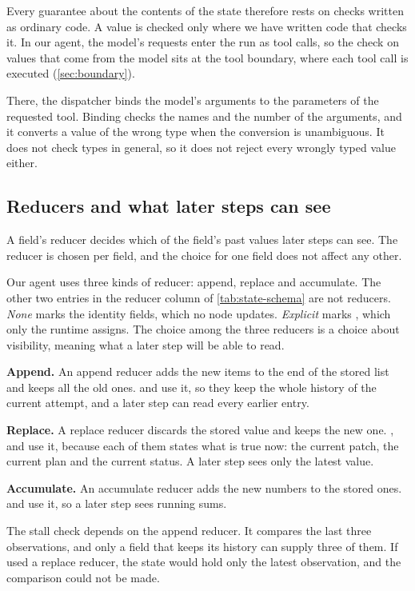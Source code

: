 Every guarantee about the contents of the state therefore rests on checks written as ordinary code.
A value is checked only where we have written code that checks it. In our agent, the model's
requests enter the run as tool calls, so the check on values that come from the model sits at the
tool boundary, where each tool call is executed (\cref{sec:boundary}).

There, the dispatcher binds the model's arguments to the parameters of the requested tool. Binding
checks the names and the number of the arguments, and it converts a value of the wrong type when the
conversion is unambiguous. It does not check types in general, so it does not reject every wrongly
typed value either.

\subsection{Reducers and what later steps can see}
\label{sec:state-reducers}

A field's reducer decides which of the field's past values later steps can see. The reducer is
chosen per field, and the choice for one field does not affect any other.

Our agent uses three kinds of reducer: append, replace and accumulate. The other two entries in the
reducer column of \cref{tab:state-schema} are not reducers. \emph{None} marks the identity fields,
which no node updates. \emph{Explicit} marks , which only the runtime assigns. The
choice among the three reducers is a choice about visibility, meaning what a later step will be able
to read.
\bi
\item \textbf{Append.} An append reducer adds the new items to the end of the stored list and keeps
all the old ones.  and  use it, so they keep the whole
history of the current attempt, and a later step can read every earlier entry.
\item \textbf{Replace.} A replace reducer discards the stored value and keeps the new one.
,  and  use it, because each of them states
what is true now: the current patch, the current plan and the current status. A later step sees only
the latest value.
\item \textbf{Accumulate.} An accumulate reducer adds the new numbers to the stored ones.
 and  use it, so a later step sees running sums.
\ei

The stall check depends on the append reducer. It compares the last three observations, and only a
field that keeps its history can supply three of them. If  used a replace
reducer, the state would hold only the latest observation, and the comparison could not be made.

